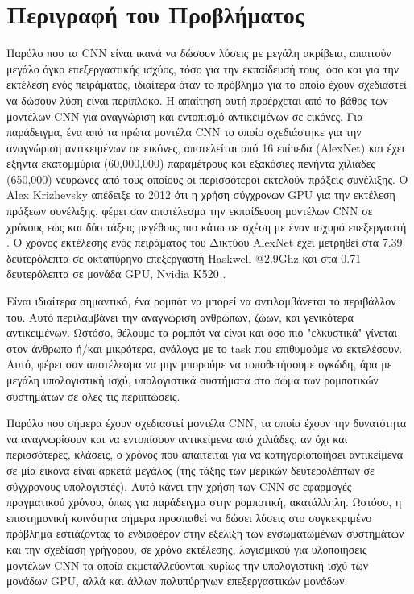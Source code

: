 \section{Περιγραφή του Προβλήματος}
\label{section:problem_description}

Παρόλο που τα CΝΝ είναι ικανά να δώσουν λύσεις με μεγάλη ακρίβεια, απαιτούν
μεγάλο όγκο επεξεργαστικής ισχύος, τόσο για την εκπαίδευσή τους, όσο και για την
εκτέλεση ενός πειράματος, ιδιαίτερα όταν το πρόβλημα για το οποίο έχουν
σχεδιαστεί να δώσουν λύση είναι περίπλοκο. Η απαίτηση αυτή προέρχεται από το βάθος %
των μοντέλων CNN για αναγνώριση και εντοπισμό αντικειμένων σε εικόνες.
Για παράδειγμα, ένα από τα πρώτα μοντέλα CNN το οποίο σχεδιάστηκε για την
αναγνώριση αντικειμένων σε εικόνες, αποτελείται από 16 επίπεδα (AlexNet)
και έχει εξήντα εκατομμύρια (60,000,000) παραμέτρους και
εξακόσιες πενήντα χιλιάδες (650,000) νευρώνες από τους οποίους οι περισσότεροι
εκτελούν πράξεις συνέλιξης. Ο Alex Krizhevsky απέδειξε το 2012 ότι η χρήση
σύγχρονων GPU για την εκτέλεση πράξεων συνέλιξης, φέρει σαν αποτέλεσμα την
εκπαίδευση μοντέλων CNN σε χρόνους εώς και δύο τάξεις μεγέθους πιο κάτω σε σχέση
με έναν ισχυρό επεξεργαστή \cite{NIPS2012_4824}.
Ο χρόνος εκτέλεσης ενός πειράματος του Δικτύου AlexNet
έχει μετρηθεί στα 7.39 δευτερόλεπτα σε οκταπύρηνο επεξεργαστή Haskwell @2.9Ghz
και στα 0.71 δευτερόλεπτα σε μονάδα GPU, Nvidia K520 \cite{abuzaidoptimizing}.

Είναι ιδιαίτερα σημαντικό, ένα ρομπότ να μπορεί να αντιλαμβάνεται το περιβάλλον
του.
Αυτό περιλαμβάνει την αναγνώριση ανθρώπων, ζώων, και γενικότερα αντικειμένων. Ωστόσο,
θέλουμε τα ρομπότ να είναι και όσο πιο "ελκυστικά" γίνεται στον άνθρωπο ή/και μικρότερα,
ανάλογα με το task που επιθυμούμε να εκτελέσουν.
Αυτό, φέρει σαν αποτέλεσμα να μην μπορούμε να τοποθετήσουμε ογκώδη, άρα με μεγάλη
υπολογιστική ισχύ, υπολογιστικά συστήματα στο σώμα των ρομποτικών συστημάτων σε όλες
τις περιπτώσεις.

Παρόλο που σήμερα έχουν σχεδιαστεί μοντέλα CNN, τα οποία έχουν την δυνατότητα να
αναγνωρίσουν και να εντοπίσουν αντικείμενα από χιλιάδες, αν όχι και περισσότερες,
κλάσεις, ο χρόνος που απαιτείται για να κατηγοριοποιήσει αντικείμενα σε μία εικόνα
είναι αρκετά μεγάλος (της τάξης των μερικών δευτερολέπτων σε σύγχρονους υπολογιστές).
Αυτό κάνει την χρήση των CNN σε εφαρμογές πραγματικού χρόνου, όπως για παράδειγμα
στην ρομποτική, ακατάλληλη.
Ωστόσο, η επιστημονική κοινότητα σήμερα προσπαθεί να δώσει λύσεις στο συγκεκριμένο
πρόβλημα εστιάζοντας το ενδιαφέρον στην εξέλιξη των ενσωματωμένων συστημάτων
και την σχεδίαση γρήγορου, σε χρόνο εκτέλεσης, λογισμικού για υλοποιήσεις μοντέλων CNN τα οποία
εκμεταλλεύονται κυρίως την υπολογιστική ισχύ των μονάδων GPU, αλλά και άλλων
πολυπύρηνων επεξεργαστικών μονάδων.
